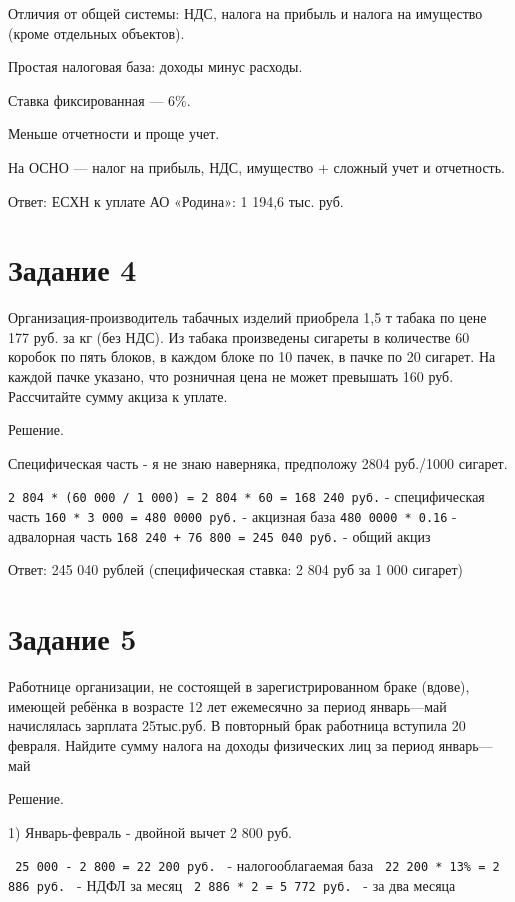 \documentclass[14pt,a4paper]{extarticle}
\begin{document}
Отличия от общей системы:
 НДС, налога на прибыль и налога на имущество (кроме отдельных объектов).

Простая налоговая база: доходы минус расходы.

Ставка фиксированная — 6\%.

Меньше отчетности и проще учет.

На ОСНО — налог на прибыль, НДС, имущество + сложный учет и отчетность.

Ответ: ЕСХН к уплате АО «Родина»: 1 194,6 тыс. руб.

\section{Задание 4}

Организация-производитель табачных изделий приобрела 1,5 т табака по
цене 177 руб. за кг (без НДС). Из табака произведены сигареты в количестве 60 коробок по
пять блоков, в каждом блоке по 10 пачек, в пачке по 20 сигарет. На каждой пачке указано,
что розничная цена не может превышать 160 руб.
Рассчитайте сумму акциза к уплате.

Решение.

Специфическая часть - я не знаю наверняка, предположу 2804 руб./1000 сигарет.

\texttt{2 804 * (60 000 / 1 000) = 2 804 * 60 = 168 240 руб.} - специфическая часть
\texttt{160 * 3 000 = 480 0000 руб.} - акцизная база
\texttt{480 0000 * 0.16} - адвалорная часть
\texttt{168 240 + 76 800 = 245 040 руб.} - общий акциз

Ответ: 245 040 рублей (специфическая ставка: 2 804 руб за 1 000 сигарет)

\section{Задание 5}
Работнице организации, не состоящей в зарегистрированном браке (вдове),
имеющей ребёнка в возрасте 12 лет ежемесячно за период январь—май начислялась
зарплата 25тыс.руб. В повторный брак работница вступила 20 февраля. Найдите
сумму налога на доходы физических лиц за период январь—май

Решение.

1) Январь-февраль - двойной вычет 2 800 руб.

\texttt{ 25 000 - 2 800 = 22 200 руб. } - налогооблагаемая база\newline
\texttt{ 22 200 * 13\% = 2 886 руб. } - НДФЛ за месяц\newline
\texttt{ 2 886 * 2 = 5 772 руб. } - за два месяца\newline
\end{document}
